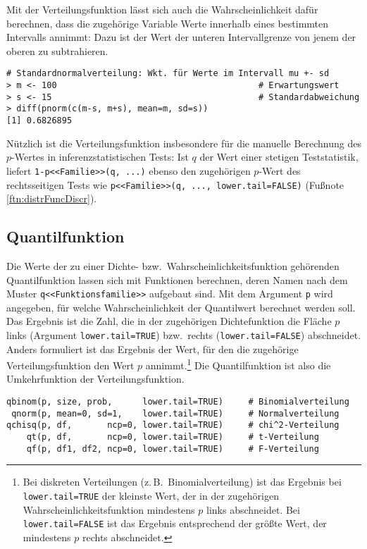 Mit der Verteilungsfunktion lässt sich auch die Wahrscheinlichkeit dafür berechnen, dass die zugehörige Variable Werte innerhalb eines bestimmten Intervalls annimmt: Dazu ist der Wert der unteren Intervallgrenze von jenem der oberen zu subtrahieren.
\begin{lstlisting}
# Standardnormalverteilung: Wkt. für Werte im Intervall mu +- sd
> m <- 100                                        # Erwartungswert
> s <- 15                                         # Standardabweichung
> diff(pnorm(c(m-s, m+s), mean=m, sd=s))
[1] 0.6826895
\end{lstlisting}

Nützlich ist die Verteilungsfunktion insbesondere für die manuelle Berechnung des $p$-Wertes in inferenzstatistischen Tests: Ist $q$ der Wert einer stetigen Teststatistik, liefert \lstinline!1-p<<Familie>>(q, ...)! ebenso den zugehörigen $p$-Wert des rechtsseitigen Tests wie \lstinline!p<<Familie>>(q, ..., lower.tail=FALSE)! (Fußnote \ref{ftn:distrFuncDiscr}).

\subsection{Quantilfunktion}
\label{sec:quantFunc}

Die Werte der zu einer Dichte- bzw.\ Wahrscheinlichkeitsfunktion gehörenden Quantilfunktion lassen sich mit Funktionen berechnen, deren Namen nach dem Muster \lstinline!q<<Funktionsfamilie>>! aufgebaut sind. Mit dem Argument \lstinline!p! wird angegeben, für welche Wahrscheinlichkeit der Quantilwert berechnet werden soll. Das Ergebnis ist die Zahl, die in der zugehörigen Dichtefunktion die Fläche $p$ links (Argument \lstinline!lower.tail=TRUE!) bzw.\ rechts (\lstinline!lower.tail=FALSE!) abschneidet. Anders formuliert ist das Ergebnis der Wert, für den die zugehörige Verteilungsfunktion den Wert $p$ annimmt.\footnote{Bei diskreten Verteilungen (z.\,B.\ Binomialverteilung) ist das Ergebnis bei \lstinline!lower.tail=TRUE! der kleinste Wert, der in der zugehörigen Wahrscheinlichkeitsfunktion mindestens $p$ links abschneidet. Bei \lstinline!lower.tail=FALSE! ist das Ergebnis entsprechend der größte Wert, der mindestens $p$ rechts abschneidet.} Die Quantilfunktion ist also die Umkehrfunktion der Verteilungsfunktion.
\begin{lstlisting}
qbinom(p, size, prob,      lower.tail=TRUE)     # Binomialverteilung
 qnorm(p, mean=0, sd=1,    lower.tail=TRUE)     # Normalverteilung
qchisq(p, df,       ncp=0, lower.tail=TRUE)     # chi^2-Verteilung
    qt(p, df,       ncp=0, lower.tail=TRUE)     # t-Verteilung
    qf(p, df1, df2, ncp=0, lower.tail=TRUE)     # F-Verteilung
\end{lstlisting}

